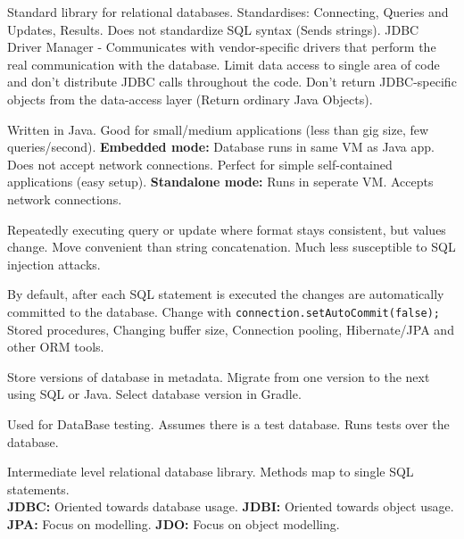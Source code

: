 \documentclass[number]{assignment}
\begin{document}
\begin{landscape}
\begin{multicols}{3}
\small Standard library for relational databases. Standardises: Connecting, Queries and Updates, Results. Does not standardize SQL syntax (Sends strings).
\small JDBC Driver Manager - Communicates with vendor-specific drivers that perform the real communication with the database.
\small Limit data access to single area of code and don't distribute JDBC calls throughout the code. Don't return JDBC-specific objects from the data-access layer (Return ordinary Java Objects).

\small Written in Java. Good for small/medium applications (less than gig size, few queries/second). \textbf{Embedded mode:} Database runs in same VM as Java app. Does not accept network connections. Perfect for simple self-contained applications (easy setup). \textbf{Standalone mode:} Runs in seperate VM. Accepts network connections.

\small Repeatedly executing query or update where format stays consistent, but values change.
\small Move convenient than string concatenation. Much less susceptible to SQL injection attacks.

\small By default, after each SQL statement is executed the changes are automatically committed to the database. Change with \texttt{connection.setAutoCommit(false);}
\small Stored procedures, Changing buffer size, Connection pooling, Hibernate/JPA and other ORM tools.

\small Store versions of database in metadata. Migrate from one version to the next using SQL or Java. Select database version in Gradle.

\small Used for DataBase testing. Assumes there is a test database. Runs tests over the database.

\small Intermediate level relational database library. Methods map to single SQL statements.\\

\small\textbf{JDBC:} Oriented towards database usage. \textbf{JDBI:} Oriented towards object usage. \textbf{JPA:} Focus on modelling. \textbf{JDO:} Focus on object modelling.

\end{multicols}
\end{landscape}
\end{document}
